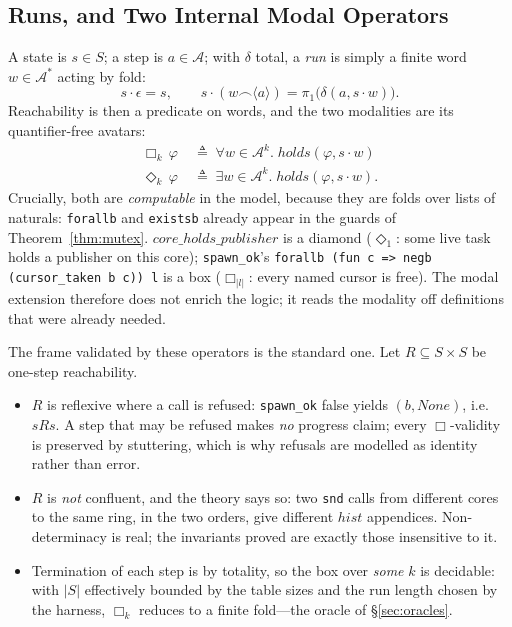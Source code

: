 \documentclass[10pt,journal,compsoc,twocolumn]{article}
\theoremstyle{definition}
\theoremstyle{remark}
\theoremstyle{plain}
\newcommand{\ctr}[1]{\texttt{#1}}
\begin{document}
\subsection{Runs, and Two Internal Modal Operators}
\label{sec:independence}
A state is \(s \in S\); a step is \(a \in \mathcal{A}\); with \(\delta\) total, a \emph{run} is simply a finite word \(w \in \mathcal{A}^{*}\) acting by fold:
\begin{equation}
s \cdot \epsilon = s, \qquad s \cdot (w \frown \langle a \rangle) = \pi_1\big(\delta(a, s \cdot w)\big).
\end{equation}
Reachability is then a predicate on words, and the two modalities are its quantifier-free avatars:
\begin{align}
\Box_{k}\,\varphi \;&\triangleq\; \forall w \in \mathcal{A}^{k}.\; \mathit{holds}(\varphi, s \cdot w) \\
\Diamond_{k}\,\varphi \;&\triangleq\; \exists w \in \mathcal{A}^{k}.\; \mathit{holds}(\varphi, s \cdot w).
\end{align}
Crucially, both are \emph{computable} in the model, because they are folds over lists of naturals: \ctr{forallb} and \ctr{existsb} already appear in the guards of Theorem~\ref{thm:mutex}. \(\mathit{core\_holds\_publisher}\) is a diamond (\(\Diamond_1\): some live task holds a publisher on this core); \ctr{spawn\_ok}'s \lstinline|forallb (fun c => negb (cursor_taken b c)) l| is a box (\(\Box_{|l|}\): every named cursor is free). The modal extension therefore does not enrich the logic; it reads the modality off definitions that were already needed.

The frame validated by these operators is the standard one. Let \(R \subseteq S \times S\) be one-step reachability.
\begin{itemize}[leftmargin=*]
    \item $R$ is reflexive where a call is refused: \ctr{spawn\_ok} false yields \((b, \mathit{None})\), i.e.\ \(s R s\). A step that may be refused makes \emph{no} progress claim; every \(\Box\)-validity is preserved by stuttering, which is why refusals are modelled as identity rather than error.
    \item \(R\) is \emph{not} confluent, and the theory says so: two \ctr{snd} calls from different cores to the same ring, in the two orders, give different \(\mathit{hist}\) appendices. Non-determinacy is real; the invariants proved are exactly those insensitive to it.
    \item Termination of each step is by totality, so the box over \emph{some} \(k\) is decidable: with \(|S|\) effectively bounded by the table sizes and the run length chosen by the harness, \(\Box_k\) reduces to a finite fold---the oracle of \S\ref{sec:oracles}.
\end{itemize}
\end{document}
